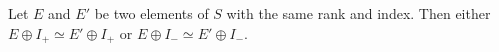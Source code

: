Let $E$ and $E'$ be two elements of $S$ with the same rank and index. Then either $E \oplus I_+ \simeq E' \oplus I_+$ or $E \oplus I_- \simeq E' \oplus I_-$.
